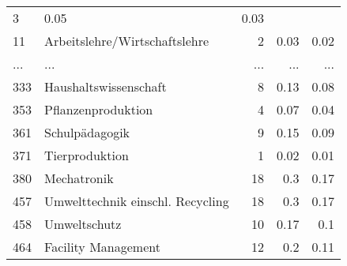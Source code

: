 \begin{longtable}{lXrrr}
          \num{3} &
          \num[round-mode=places,round-precision=2]{0.05} &
          \num[round-mode=places,round-precision=2]{0.03} \\
        11 & \multicolumn{1}{X}{Arbeitslehre/Wirtschaftslehre} & %
          \num{2} &
          \num[round-mode=places,round-precision=2]{0.03} &
          \num[round-mode=places,round-precision=2]{0.02} \\
       ... & ... & ... & ... & ... \\
        333 & \multicolumn{1}{X}{Haushaltswissenschaft} & %
          \num{8} &
          \num[round-mode=places,round-precision=2]{0.13} &
          \num[round-mode=places,round-precision=2]{0.08} \\

        353 & \multicolumn{1}{X}{Pflanzenproduktion} & %
          \num{4} &
          \num[round-mode=places,round-precision=2]{0.07} &
          \num[round-mode=places,round-precision=2]{0.04} \\

        361 & \multicolumn{1}{X}{Schulpädagogik} & %
          \num{9} &
          \num[round-mode=places,round-precision=2]{0.15} &
          \num[round-mode=places,round-precision=2]{0.09} \\

        371 & \multicolumn{1}{X}{Tierproduktion} & %
          \num{1} &
          \num[round-mode=places,round-precision=2]{0.02} &
          \num[round-mode=places,round-precision=2]{0.01} \\

        380 & \multicolumn{1}{X}{Mechatronik} & %
          \num{18} &
          \num[round-mode=places,round-precision=2]{0.3} &
          \num[round-mode=places,round-precision=2]{0.17} \\

        457 & \multicolumn{1}{X}{Umwelttechnik einschl. Recycling} & %
          \num{18} &
          \num[round-mode=places,round-precision=2]{0.3} &
          \num[round-mode=places,round-precision=2]{0.17} \\

        458 & \multicolumn{1}{X}{Umweltschutz} & %
          \num{10} &
          \num[round-mode=places,round-precision=2]{0.17} &
          \num[round-mode=places,round-precision=2]{0.1} \\

        464 & \multicolumn{1}{X}{Facility Management} & %
          \num{12} &
          \num[round-mode=places,round-precision=2]{0.2} &
          \num[round-mode=places,round-precision=2]{0.11} \\


\end{longtable}

